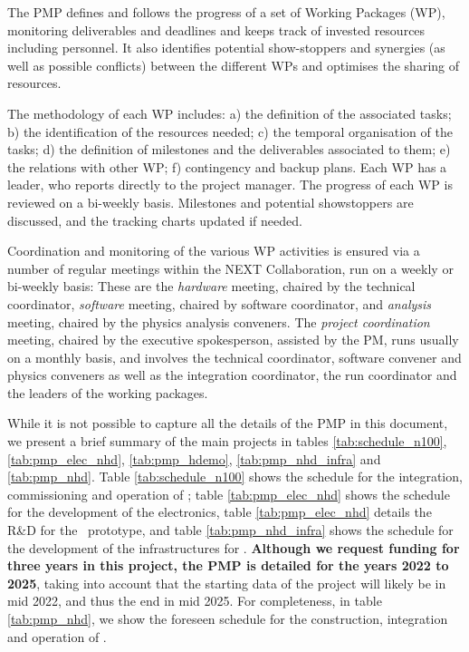 The PMP defines and follows the progress of a set of Working Packages (WP), monitoring deliverables and deadlines and keeps track of invested resources including personnel. It also identifies potential show-stoppers and synergies (as well as possible conflicts) between the different WPs and optimises the sharing of resources. 


The methodology of each WP includes: a) the definition of the associated tasks; b) the identification of the resources needed; c) the temporal organisation of the tasks; d) the definition of milestones and the deliverables associated to them; e) the relations with other WP; f) contingency and backup plans. Each WP has a leader, who reports directly to the project manager. The progress of each WP is reviewed on a bi-weekly basis. Milestones and potential showstoppers are discussed, and the tracking charts updated if needed.

Coordination and monitoring of the various WP activities is ensured via a number of regular meetings within the NEXT Collaboration, run on a weekly or bi-weekly basis: These are the  {\em hardware} meeting, chaired by the technical coordinator, {\em software} meeting, chaired by software coordinator, and {\em analysis} meeting, chaired by the physics analysis conveners. The {\em project coordination} meeting, chaired by the  executive spokesperson, assisted by the PM, runs usually on a monthly basis, and involves the technical coordinator, software convener and physics conveners as well as the integration coordinator, the run coordinator and the leaders of the working packages. 


While it is not possible to capture all the details of the PMP in this document, we present a brief summary of the main projects in tables \ref{tab:schedule_n100}, \ref{tab:pmp_elec_nhd}, \ref{tab:pmp_hdemo}, \ref{tab:pmp_nhd_infra} and
\ref{tab:pmp_nhd}. Table  \ref{tab:schedule_n100} shows the schedule for the integration, commissioning and operation of \Next; 
table \ref{tab:pmp_elec_nhd} shows the schedule for the development of the electronics, table  \ref{tab:pmp_elec_nhd} details the R\&D for the \HDEMO\ prototype, and table \ref{tab:pmp_nhd_infra} shows the schedule for the development of the infrastructures for \NHD. {\bf Although we request funding for three years in this project, the PMP is detailed for the years 2022 to 2025}, taking into account that the starting data of the project will likely be in mid 2022, and thus the end in mid 2025. For completeness, in table \ref{tab:pmp_nhd}, we show the foreseen schedule for the construction, integration and operation of \NHD.







